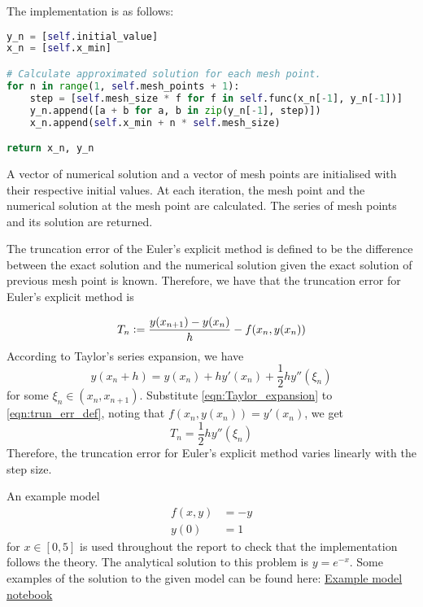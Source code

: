 The implementation is as follows:
\begin{lstlisting}[language=Python, caption= {Euler's explicit method}, title={Euler's explicit method}, label=Euler_explicit_code]
y_n = [self.initial_value]
x_n = [self.x_min]

# Calculate approximated solution for each mesh point.
for n in range(1, self.mesh_points + 1):
    step = [self.mesh_size * f for f in self.func(x_n[-1], y_n[-1])]
    y_n.append([a + b for a, b in zip(y_n[-1], step)])
    x_n.append(self.x_min + n * self.mesh_size)

return x_n, y_n
\end{lstlisting}

A vector of numerical solution and a vector of mesh points are initialised with their respective initial values. At each iteration, the mesh point and the numerical solution at the mesh point are calculated. The series of mesh points and its solution are returned.

The truncation error of the Euler's explicit method is defined to be the difference between the exact solution and the numerical solution given the exact solution of previous mesh point is known. Therefore, we have that the truncation error for Euler's explicit method is

\begin{equation}
\label{eqn:trun_err_def}
    T_n \vcentcolon= \frac{y(x_{n+1}) - y(x_{n})}{h} - f(x_n, y(x_n))
\end{equation}
According to Taylor's series expansion, we have 
\begin{equation}
\label{eqn:Taylor_expansion}
    y(x_n + h) = y(x_n) + hy'(x_n) + \frac{1}{2}hy''(\xi_n)
\end{equation}
for some $\xi_n \in (x_n, x_{n+1})$. Substitute \ref{eqn:Taylor_expansion} to \ref{eqn:trun_err_def}, noting that $f(x_n, y(x_n)) = y'(x_n)$, we get
\begin{equation}
    T_n = \frac{1}{2}hy''(\xi_n)
\end{equation}
Therefore, the truncation error for Euler's explicit method varies linearly with the step size.

An example model 
\begin{align}
\label{eqn:example_model}
    f(x,y) &= -y \\
    y(0) &= 1
\end{align}
for $x \in [0, 5]$ is used throughout the report to check that the implementation follows the theory. The analytical solution to this problem is $y = e^{-x}$. Some examples of the solution to the given model can be found here: \href{https://nbviewer.jupyter.org/github/FarmHJ/numerical-solver/blob/main/examples/solver_convergence.ipynb}{Example model notebook}


